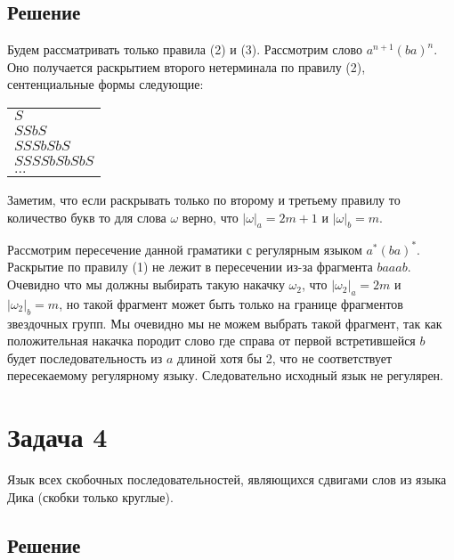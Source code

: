 \documentclass[a4paper, 14pt]{extarticle}
\begin{document}
\subsection{Решение}

Будем рассматривать только правила (2) и (3). Рассмотрим слово $a^{n + 1}(ba)^n$. Оно
получается раскрытием второго нетерминала по правилу (2), сентенциальные формы следующие:

\begin{center}
  \begin{tabular}{l}
    $S$ \\
    $SSbS$ \\
    $SSSbSbS$ \\
    $SSSSbSbSbS$ \\
    $...$
  \end{tabular}
\end{center}

Заметим, что если раскрывать только по второму и третьему правилу то количество букв то для
слова $\omega$ верно, что $|\omega|_a = 2m + 1$ и $|\omega|_b = m$.

Рассмотрим пересечение данной граматики с регулярным языком $a^*(ba)^*$. Раскрытие по правилу (1)
не лежит в пересечении из-за фрагмента $baaab$. Очевидно что мы должны выбирать такую накачку
$\omega_2$, что $|\omega_2|_a = 2m$ и $|\omega_2|_b = m$, но такой фрагмент может быть только
на границе фрагментов звездочных групп. Мы очевидно мы не можем выбрать такой фрагмент, так
как положительная накачка породит слово где справа от первой встретившейся $b$ будет
последовательность из $a$ длиной хотя бы 2, что не соответствует пересекаемому регулярному языку. 
Следовательно исходный язык не регулярен.

\newpage
\section{Задача 4}

Язык всех скобочных последовательностей, являющихся сдвигами слов из языка Дика
(скобки только круглые).

\subsection{Решение}
\end{document}

